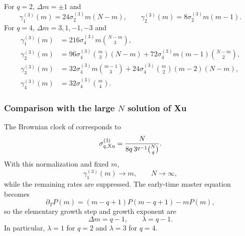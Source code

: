 \documentclass{article}
\theoremstyle{definition}
\begin{document}
For $q=2$, $\Delta m=\pm1$ and
\begin{equation}
    \gamma_1^{(3)}(m)
    =24\sigma_2^{(3)}m(N-m),
    \qquad
    \gamma_2^{(3)}(m)
    =8\sigma_2^{(3)}m(m-1).
\end{equation}
For $q=4$, $\Delta m=3,1,-1,-3$ and
\begin{align}
    \gamma_1^{(3)}(m)
    &=216\sigma_4^{(3)}m\binom{N-m}{3},
    \\
    \gamma_2^{(3)}(m)
    &=96\sigma_4^{(3)}\binom m3(N-m)
      +72\sigma_4^{(3)}m(m-1)\binom{N-m}{2},
    \\
    \gamma_3^{(3)}(m)
    &=32\sigma_4^{(3)}m\binom{m-1}{3}
      +24\sigma_4^{(3)}\binom m2(m-2)(N-m),
    \\
    \gamma_4^{(3)}(m)
    &=32\sigma_4^{(3)}\binom m4.
\end{align}

\subsubsection{Comparison with the large $N$ solution of Xu}

The Brownian clock of \cite{XuBrownianSpin} corresponds to
\begin{equation}
    \sigma_{q,{\rm Xu}}^{(3)}
    =\frac{N}{8q\,3^{q-1}\binom Nq}.
\end{equation}
With this normalization and fixed $m$,
\begin{equation}
    \gamma_1^{(3)}(m)\longrightarrow m,
    \qquad N\to\infty,
\end{equation}
while the remaining rates are suppressed.  The early-time master equation
becomes
\begin{equation}
    \partial_TP(m)
    =(m-q+1)P(m-q+1)-mP(m),
\end{equation}
so the elementary growth step and growth exponent are
\begin{equation}
    \Delta m=q-1,
    \qquad
    \lambda=q-1.
\end{equation}
In particular, $\lambda=1$ for $q=2$ and $\lambda=3$ for $q=4$.
\end{document}
